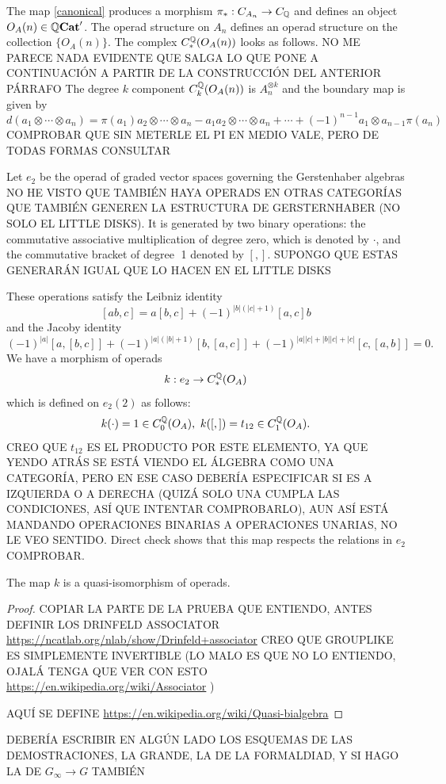 \documentclass[TFM.tex]{subfiles}
\begin{document}
The map \ref{canonical} produces a morphism $\pi_*: C_{A_n}\to C_{\mathbb{Q}}$ and defines an object
$O_A(n)\in \mathbb{Q}\mathrm{\mathbf{Cat}}'$. The operad structure on $A_n$ defines an operad structure on the
collection $\{O_A(n)\}$. 
The complex $C_*^{\mathbb{Q}}(O_A(n))$ looks as follows. NO ME PARECE NADA EVIDENTE QUE SALGA LO QUE PONE A CONTINUACIÓN A PARTIR DE LA CONSTRUCCIÓN DEL ANTERIOR PÁRRAFO The degree $k$ component $C_k^{\mathbb{Q}}(O_A(n))$ is $A_n^{\otimes k}$ and the boundary map is given by
\[
d(a_1\otimes\cdots\otimes a_n)=\pi(a_1)a_2\otimes\cdots\otimes a_n-a_1a_2\otimes \cdots\otimes a_n+\cdots+(-1)^{n-1}a_1\otimes a_{n-1}\pi(a_n)
\]
COMPROBAR QUE SIN METERLE EL PI EN MEDIO VALE, PERO DE TODAS FORMAS CONSULTAR

Let $e_2$ be the operad of graded vector spaces governing the Gerstenhaber algebras NO HE VISTO QUE TAMBIÉN HAYA OPERADS EN OTRAS CATEGORÍAS QUE TAMBIÉN GENEREN LA ESTRUCTURA DE GERSTERNHABER (NO SOLO EL LITTLE DISKS).
It is generated by two binary operations: the commutative associative multiplication
of degree zero, which is denoted by $\cdot$, and the commutative bracket of degree 1
denoted by $[,]$. SUPONGO QUE ESTAS GENERARÁN IGUAL QUE LO HACEN EN EL LITTLE DISKS

These operations satisfy the Leibniz identity
\[
[ab, c]= a[b, c]+(-1)^{|b|(|c|+1)}[a,c]b
\]
and the Jacoby identity
\[
(-1)^{|a|}[a,[b,c]]+(-1)^{|a|(|b|+1)}[b,[a,c]]+(-1)^{|a||c|+|b||c|+|c|}[c,[a,b]]=0.
\]
We have a morphism of operads
\[
k:e_2\to C_*^{\mathbb{Q}}(O_A)
\]
which is defined on $e_2(2)$ as follows:
\[
k(\cdot)=1\in C_0^\Q(O_A),\ k([,])=t_{12}\in C_1^\Q(O_A).
\]
CREO QUE $t_{12}$ ES EL PRODUCTO POR ESTE ELEMENTO, YA QUE YENDO ATRÁS SE ESTÁ VIENDO EL ÁLGEBRA COMO UNA CATEGORÍA, PERO EN ESE CASO DEBERÍA ESPECIFICAR SI ES A IZQUIERDA O A DERECHA (QUIZÁ SOLO UNA CUMPLA LAS CONDICIONES, ASÍ QUE INTENTAR COMPROBARLO), AUN ASÍ ESTÁ MANDANDO OPERACIONES BINARIAS A OPERACIONES UNARIAS, NO LE VEO SENTIDO. Direct check shows that this map respects the relations in $e_2$ COMPROBAR.


\begin{prop}
The map $k$ is a quasi-isomorphism of operads. 
\end{prop}
\begin{proof}
COPIAR LA PARTE DE LA PRUEBA QUE ENTIENDO, ANTES DEFINIR LOS DRINFELD ASSOCIATOR \url{https://ncatlab.org/nlab/show/Drinfeld+associator} CREO QUE GROUPLIKE ES SIMPLEMENTE INVERTIBLE (LO MALO ES QUE NO LO ENTIENDO, OJALÁ TENGA QUE VER CON ESTO \url{https://en.wikipedia.org/wiki/Associator} ) 

AQUÍ SE DEFINE \url{https://en.wikipedia.org/wiki/Quasi-bialgebra}
\end{proof}



DEBERÍA ESCRIBIR EN ALGÚN LADO LOS ESQUEMAS DE LAS DEMOSTRACIONES, LA GRANDE, LA DE LA FORMALDIAD, Y SI HAGO LA DE $G_\infty\to G$ TAMBIÉN
\end{document}
